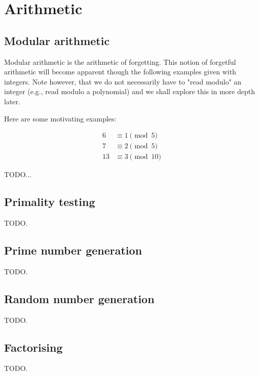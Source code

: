 \section{Arithmetic} %
\label{sec:arithmetic}

\subsection{Modular arithmetic}
Modular arithmetic is the arithmetic of forgetting.
This notion of forgetful arithmetic will become apparent though
the following examples given with integers. Note however, that we
do not necessarily have to "read modulo" an integer (e.g., read modulo a polynomial)
and we shall explore this in more depth later.

Here are some motivating examples:
\begin{exmp}
\begin{align}
 6 & \equiv 1 \pmod{5}
 \\
 7 & \equiv 2 \pmod{5}
 \\
 13 & \equiv 3 \pmod{10}
\end{align}
\end{exmp}
TODO...

\subsection{Primality testing}
TODO.

\subsection{Prime number generation}
TODO.

\subsection{Random number generation}
TODO.

\subsection{Factorising}
TODO.